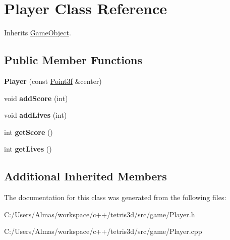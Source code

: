 \hypertarget{class_player}{\section{Player Class Reference}
\label{class_player}
}


Inherits \hyperlink{class_game_object}{Game\-Object}.

\subsection*{Public Member Functions}
\begin{DoxyCompactItemize}
\item 
\hypertarget{class_player_a19dd85169ea58ba67b3911d459e2545f}{{\bfseries Player} (const \hyperlink{struct_point3f}{Point3f} \&center)}\label{class_player_a19dd85169ea58ba67b3911d459e2545f}

\item 
\hypertarget{class_player_ad2a75feafb7f1256e1b4fb9170d3a49d}{void {\bfseries add\-Score} (int)}\label{class_player_ad2a75feafb7f1256e1b4fb9170d3a49d}

\item 
\hypertarget{class_player_a280dfcab0a268c0920f41ffd0334a1ea}{void {\bfseries add\-Lives} (int)}\label{class_player_a280dfcab0a268c0920f41ffd0334a1ea}

\item 
\hypertarget{class_player_a97e5447778ae6c384eedc532dcd8431d}{int {\bfseries get\-Score} ()}\label{class_player_a97e5447778ae6c384eedc532dcd8431d}

\item 
\hypertarget{class_player_af56ac33b9b2ebd9f97c8a6f485cf2d47}{int {\bfseries get\-Lives} ()}\label{class_player_af56ac33b9b2ebd9f97c8a6f485cf2d47}

\end{DoxyCompactItemize}
\subsection*{Additional Inherited Members}


The documentation for this class was generated from the following files\-:\begin{DoxyCompactItemize}
\item 
C\-:/\-Users/\-Almas/workspace/c++/tetris3d/src/game/Player.\-h\item 
C\-:/\-Users/\-Almas/workspace/c++/tetris3d/src/game/Player.\-cpp\end{DoxyCompactItemize}
